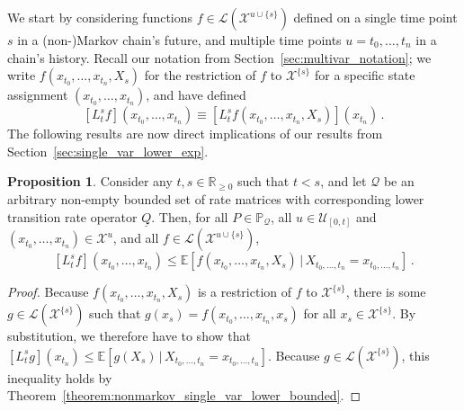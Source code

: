 \documentclass[10pt]{paper}
\theoremstyle{definition}
\newtheorem{proposition}[theorem]{Proposition}
\newcommand{\reals}{\mathbb{R}}
\newcommand{\realsnonneg}{\reals_{\geq 0}}
\newcommand{\states}{\mathcal{X}}
\newcommand{\processes}{\mathbb{P}}
\newcommand{\gambles}{\mathcal{L}}
\newcommand{\rateset}{\mathcal{Q}}
\newcommand{\lrate}{\underline{Q}}
\begin{document}
We start by considering functions $f\in\gambles(\states^{u\cup\{s\}})$ defined on a single time point $s$ in a (non-)Markov chain's future, and multiple time points $u=t_0,\ldots,t_n$ in a chain's history. Recall our notation from Section~\ref{sec:multivar_notation}; we write $f(x_{t_0},\ldots,x_{t_n},X_s)$ for the restriction of $f$ to $\states^{\{s\}}$ for a specific state assignment $(x_{t_0},\ldots,x_{t_n})$, and have defined
\begin{equation*}
\left[L_t^sf\right](x_{t_0},\ldots,x_{t_n}) \equiv \left[L_t^sf(x_{t_0},\ldots,x_{t_n},X_s)\right](x_{t_n})\,.
\end{equation*}
The following results are now direct implications of our results from Section~\ref{sec:single_var_lower_exp}.
\begin{proposition}\label{prop:multi_var_single_future_bounded}
Consider any $t,s\in\realsnonneg$ such that $t<s$, and let $\rateset$ be an arbitrary non-empty bounded set of rate matrices with corresponding lower transition rate operator $\lrate$. Then, for all $P\in\processes_\rateset$, all $u\in\mathcal{U}_{[0,t]}$ and $(x_{t_0},\ldots,x_{t_n})\in\states^u$, and all $f\in\gambles(\states^{u\cup\{s\}})$,
\begin{equation*}
\left[L_t^sf\right](x_{t_0},\ldots,x_{t_n}) \leq \mathbb{E}\left[f(x_{t_0},\ldots,x_{t_n},X_s)\,\vert\,X_{t_0,\ldots,t_n}=x_{t_0,\ldots,t_n}\right]\,.
\end{equation*}
\end{proposition}
\begin{proof}
Because $f(x_{t_0},\ldots,x_{t_n},X_s)$ is a restriction of $f$ to $\states^{\{s\}}$, there is some $g\in\gambles(\states^{\{s\}})$ such that $g(x_s) = f(x_{t_0},\ldots,x_{t_n},x_s)$ for all $x_s\in\states^{\{s\}}$. By substitution, we therefore have to show that $\left[L_t^sg\right](x_{t_n}) \leq \mathbb{E}\left[g(X_s)\,\vert\,X_{t_0,\ldots,t_n}=x_{t_0,\ldots,t_n}\right]$. Because $g\in\gambles(\states^{\{s\}})$, this inequality holds by Theorem~\ref{theorem:nonmarkov_single_var_lower_bounded}.
\end{proof}
\end{document}
